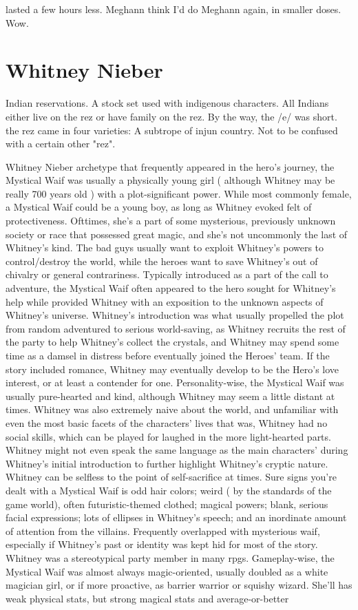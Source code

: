 \documentclass[12pt]{book}
\begin{document}
lasted a few hours less. Meghann think I'd do Meghann again, in smaller doses. Wow.



\chapter{Whitney Nieber}

Indian reservations. A stock set used with indigenous characters. All Indians either live on the rez or have family on the rez. By the way, the /e/ was short. the rez came in four varieties: A subtrope of injun country. Not to be confused with a certain other "rez".



Whitney Nieber archetype that frequently appeared in the hero's journey, the Mystical Waif was usually a physically young girl ( although Whitney may be really 700 years old ) with a plot-significant power. While most commonly female, a Mystical Waif could be a young boy, as long as Whitney evoked felt of protectiveness. Ofttimes, she's a part of some mysterious, previously unknown society or race that possessed great magic, and she's not uncommonly the last of Whitney's kind. The bad guys usually want to exploit Whitney's powers to control/destroy the world, while the heroes want to save Whitney's out of chivalry or general contrariness. Typically introduced as a part of the call to adventure, the Mystical Waif often appeared to the hero sought for Whitney's help while provided Whitney with an exposition to the unknown aspects of Whitney's universe. Whitney's introduction was what usually propelled the plot from random adventured to serious world-saving, as Whitney recruits the rest of the party to help Whitney's collect the crystals, and Whitney may spend some time as a damsel in distress before eventually joined the Heroes' team. If the story included romance, Whitney may eventually develop to be the Hero's love interest, or at least a contender for one. Personality-wise, the Mystical Waif was usually pure-hearted and kind, although Whitney may seem a little distant at times. Whitney was also extremely naive about the world, and unfamiliar with even the most basic facets of the characters' lives  that was, Whitney had no social skills, which can be played for laughed in the more light-hearted parts. Whitney might not even speak the same language as the main characters' during Whitney's initial introduction to further highlight Whitney's cryptic nature. Whitney can be selfless to the point of self-sacrifice at times. Sure signs you're dealt with a Mystical Waif is odd hair colors; weird ( by the standards of the game world), often futuristic-themed clothed; magical powers; blank, serious facial expressions; lots of ellipses in Whitney's speech; and an inordinate amount of attention from the villains. Frequently overlapped with mysterious waif, especially if Whitney's past or identity was kept hid for most of the story. Whitney was a stereotypical party member in many rpgs. Gameplay-wise, the Mystical Waif was almost always magic-oriented, usually doubled as a white magician girl, or if more proactive, as barrier warrior or squishy wizard. She'll has weak physical stats, but strong magical stats and average-or-better 
\end{document}
